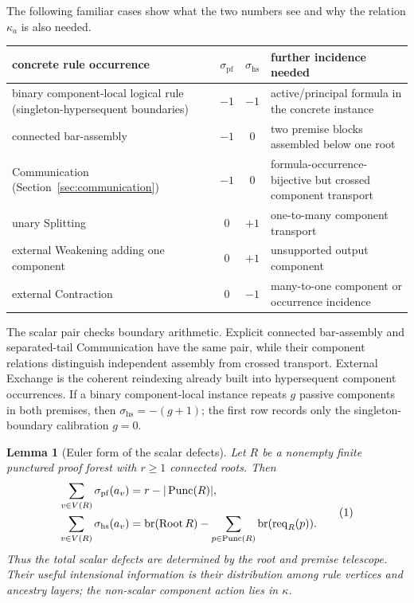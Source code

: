 \documentclass[10pt,a4paper]{article}
\theoremstyle{plain}
\newtheorem{lemma}[theorem]{Lemma}
\theoremstyle{definition}
\theoremstyle{remark}
\newcommand{\Root}{\operatorname{Root}}
\newcommand{\Req}{\operatorname{req}}
\newcommand{\Punc}{\operatorname{Punc}}
\newcommand{\br}{\operatorname{br}}
\newcommand{\eqtag}{\refstepcounter{equation}\tag{\theequation}}
\begin{document}
The following familiar cases show what the two numbers see and why the
relation \(\kappa_a\) is also needed.
\begin{center}
\small
\begin{tabular}{@{}L{4.4cm}ccL{7.2cm}@{}}
\toprule
concrete rule occurrence & \(\sigma_{\mathrm{pf}}\) &
 \(\sigma_{\mathrm{hs}}\) & further incidence needed\\
\midrule
binary component-local logical rule (singleton-hypersequent boundaries) & \(-1\) & \(-1\) &
 active/principal formula in the concrete instance\\
connected bar-assembly & \(-1\) & \(0\) &
 two premise blocks assembled below one root\\
Communication (Section~\ref{sec:communication}) & \(-1\) & \(0\) &
 formula-occurrence-bijective but crossed component transport\\
unary Splitting & \(0\) & \(+1\) &
 one-to-many component transport\\
external Weakening adding one component & \(0\) & \(+1\) &
 unsupported output component\\
external Contraction & \(0\) & \(-1\) &
 many-to-one component or occurrence incidence\\
\bottomrule
\end{tabular}
\end{center}

The scalar pair checks boundary arithmetic.  Explicit connected
bar-assembly and separated-tail Communication have the same pair, while
their component relations distinguish independent assembly from crossed
transport.  External Exchange is the coherent reindexing already built
into hypersequent component occurrences.  If a binary component-local
instance repeats \(g\) passive components in both premises, then
\(\sigma_{\mathrm{hs}}=-(g+1)\); the first row records only the
singleton-boundary calibration \(g=0\).

\begin{lemma}[Euler form of the scalar defects]
\label{lem:euler-defects}
Let \(R\) be a nonempty finite punctured proof forest with
\(r\ge1\) connected roots.
Then
\[
\begin{aligned}
 \sum_{v\in V(R)}\sigma_{\mathrm{pf}}(a_v)
   &=r-|\Punc(R)|,\\
 \sum_{v\in V(R)}\sigma_{\mathrm{hs}}(a_v)
   &=\br(\Root R)-\sum_{p\in\Punc(R)}\br(\Req_R(p)).
\end{aligned}
\eqtag\label{eq:euler-defects}
\]
Thus the total scalar defects are determined by the root and premise
telescope.  Their useful intensional information is their distribution
among rule vertices and ancestry layers; the non-scalar component action
lies in \(\kappa\).
\end{lemma}
\end{document}
